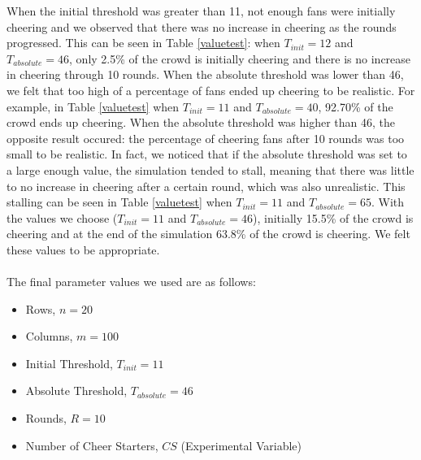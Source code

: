 \documentclass[oneside,12pt]{report}
\begin{document}
When the initial threshold was greater than 11, not enough fans were initially cheering and we observed that there was no increase in cheering as the rounds progressed. This can be seen in Table \ref{valuetest}: when $T_{init}=12$ and $T_{absolute}=46$, only 2.5\% of the crowd is initially cheering and there is no increase in cheering through 10 rounds. When the absolute threshold was lower than 46, we felt that too high of a percentage of fans ended up cheering to be realistic. For example, in Table \ref{valuetest} when $T_{init}=11$ and $T_{absolute}=40$, 92.70\% of the crowd ends up cheering. When the absolute threshold was higher than 46, the opposite result occured: the percentage of cheering fans after 10 rounds was too small to be realistic. In fact, we noticed that if the absolute threshold was set to a large enough value, the simulation tended to stall, meaning that there was little to no increase in cheering after a certain round, which was also unrealistic. This stalling can be seen in Table \ref{valuetest} when $T_{init}=11$ and $T_{absolute}=65$. With the values we choose ($T_{init}=11$ and $T_{absolute}=46$), initially 15.5\% of the crowd is cheering and at the end of the simulation 63.8\% of the crowd is cheering. We felt these values to be appropriate.

\paragraph{}
The final parameter values we used are as follows:
\begin{itemize}
		\item Rows, $n=20$
		\item Columns, $m=100$
		\item Initial Threshold, $T_{init}=11$
		\item Absolute Threshold, $T_{absolute}=46$
		\item Rounds, $R=10$
		\item Number of Cheer Starters, $CS$ (Experimental Variable)
\end{itemize}		

\end{document}

